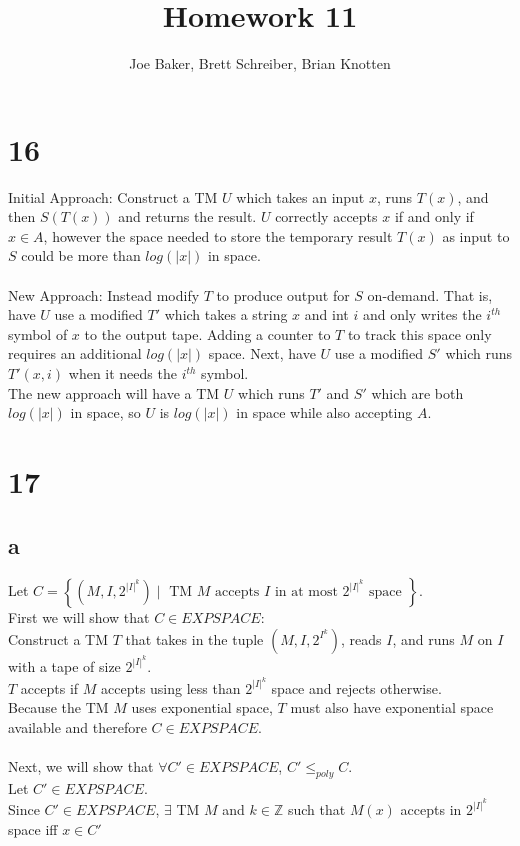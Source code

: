 \documentclass[letterpaper,notitlepage,twoside]{article}
\newcommand{\Z}{\mathbb{Z}} %
\begin{document}
\title{Homework 11}
\author{Joe Baker, Brett Schreiber, Brian Knotten}
\maketitle

\section*{16}
Initial Approach:
Construct a TM $U$ which takes an input $x$, runs $T(x)$, and then $S(T(x))$ and returns the result. $U$ correctly accepts $x$ if and only if $x \in A$, however the space needed to store the temporary result $T(x)$ as input to $S$ could be more than $log(|x|)$ in space.\\\\
New Approach:
Instead modify $T$ to produce output for $S$ on-demand. That is, have $U$ use a modified $T'$ which takes a string $x$ and int $i$ and only writes the $i^{th}$ symbol of $x$ to the output tape. Adding a counter to $T$ to track this space only requires an additional $log(|x|)$ space. Next, have $U$ use a modified $S'$ which runs $T'(x,i)$ when it needs the $i^{th}$ symbol.\\
The new approach will have a TM $U$ which runs $T'$ and $S'$ which are both $log(|x|)$ in space, so $U$ is $log(|x|)$ in space while also accepting $A$.

\section*{17}
\subsection*{a}
Let $C = \left\{ \left( M, I, 2^{|I|^k} \right) \mid \text{ TM } M \text{ accepts } I \text{ in at most } 2^{|I|^k} \text{ space } \right\}$.\\
First we will show that $C \in EXPSPACE$:\\ 
Construct a TM $T$ that takes in the tuple $(M, I, 2^{I^{k}})$, reads $I$, and runs $M$ on $I$ with a tape of size $2^{|I|^{k}}$. \\ 
$T$ accepts if $M$ accepts using less than $2^{|I|^{k}}$ space and rejects otherwise. \\
Because the TM $M$ uses exponential space, $T$ must also have exponential space available and therefore $C \in EXPSPACE$. \\ \\ 
Next, we will show that $\forall C' \in EXPSPACE$, $C' \leq_{poly} C$. \\
Let $C' \in EXPSPACE$. \\
Since $C' \in EXPSPACE$, $\exists$ TM $M$ and $k \in \Z$ such that $M(x)$ accepts in $2^{|I|^{k}}$ space iff $x \in C'$
\end{document}
